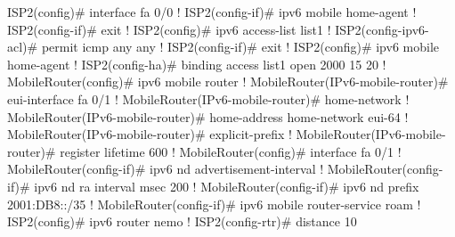 ISP2(config)# interface fa 0/0              
!
ISP2(config-if)# ipv6 mobile home-agent
!
ISP2(config-if)# exit
!
ISP2(config)# ipv6 access-list list1              
!
ISP2(config-ipv6-acl)# permit icmp any any
!
ISP2(config-if)# exit
!
ISP2(config)# ipv6 mobile home-agent              
!
ISP2(config-ha)# binding access list1 open 2000 15 20
!
MobileRouter(config)# ipv6 mobile router
!
MobileRouter(IPv6-mobile-router)# eui-interface fa 0/1
!
MobileRouter(IPv6-mobile-router)# home-network
!
MobileRouter(IPv6-mobile-router)# home-address home-network
                                  eui-64
!
MobileRouter(IPv6-mobile-router)# explicit-prefix
!
MobileRouter(IPv6-mobile-router)# register lifetime 600
!
MobileRouter(config)# interface fa 0/1
!
MobileRouter(config-if)# ipv6 nd advertisement-interval
!
MobileRouter(config-if)# ipv6 nd ra interval msec 200
!
MobileRouter(config-if)# ipv6 nd prefix 2001:DB8::/35
!
MobileRouter(config-if)# ipv6 mobile router-service roam
!
ISP2(config)# ipv6 router nemo
!
ISP2(config-rtr)# distance 10